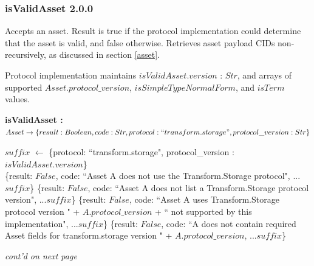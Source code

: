 \documentclass[9pt, oneside]{article}   	%
\begin{document}
\subsubsection{isValidAsset 2.0.0}\label{isValidAsset_code}

Accepts an asset. Result is true if the protocol implementation could determine that the asset is valid, and false otherwise. Retrieves asset payload CIDs non-recursively, as discussed in section \ref{asset}.

Protocol implementation maintains $isValidAsset.version$ : $Str$, and arrays of supported $Asset.protocol\_version$, $isSimpleTypeNormalForm$, and $isTerm$ values.

\vspace{.25 cm}
\begin{algorithm}[H]
\setcounter{AlgoLine}{0}
\caption{\textbf{isValidAsset : \\ $Asset \rightarrow \{result: Boolean, code: Str, protocol: ``transform.storage", protocol\_version : Str\}$}}
\label{algo_isValidAsset}
\SetAlgoLined
$suffix$ $\leftarrow$ \{protocol: ``transform.storage", protocol\_version : $isValidAsset.version$\} \\
{
		{\Return \{result: $False$, code: ``Asset A does not use the Transform.Storage protocol", ...$suffix$\}}
		{\Return \{result: $False$, code: ``Asset A does not list a Transform.Storage protocol version", ...$suffix$\}}
		{\Return \{result: $False$, code: ``Asset A uses Transform.Storage protocol version " + $A.protocol\_version$ + `` not supported by this implementation", ...$suffix$\}}
		{\Return \{result: $False$, code: ``A does not contain required Asset fields for transform.storage version " + $A.protocol\_version$, ...$suffix$\}}
		}
\end{algorithm}
\textit{cont'd on next page}
\end{document}

